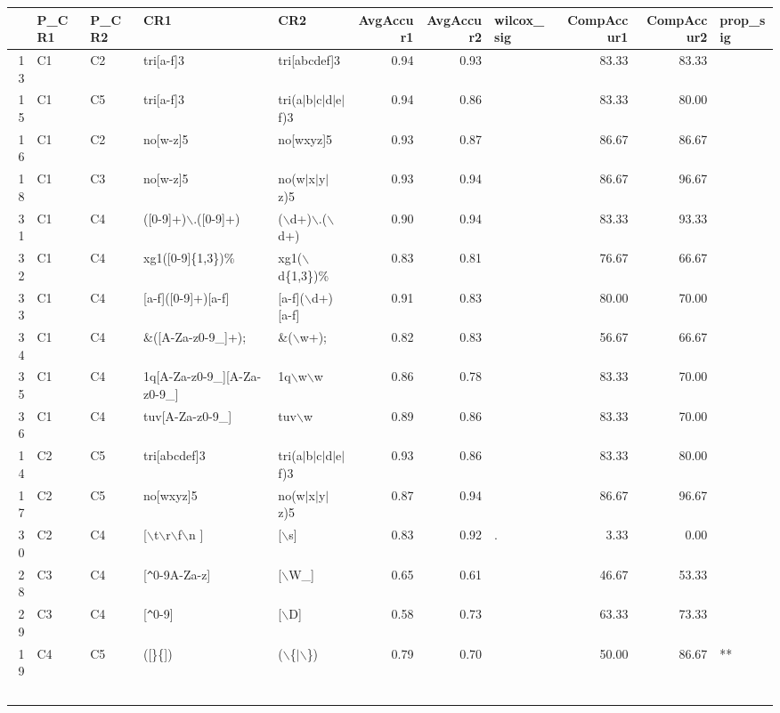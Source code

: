 \begin{table*}[ht]
\centering
\begin{tabular}{rllllrrlrrl}
  \hline
 & P\_CR1 & P\_CR2 & CR1 & CR2 & AvgAccur1 & AvgAccur2 & wilcox\_sig & CompAccur1 & CompAccur2 & prop\_sig \\ 
  \hline
13 & C1 & C2 & tri[a-f]3 & tri[abcdef]3 & 0.94 & 0.93 &   & 83.33 & 83.33 &   \\ 
  15 & C1 & C5 & tri[a-f]3 & tri(a$|$b$|$c$|$d$|$e$|$f)3 & 0.94 & 0.86 &   & 83.33 & 80.00 &   \\ 
  16 & C1 & C2 & no[w-z]5 & no[wxyz]5 & 0.93 & 0.87 &   & 86.67 & 86.67 &   \\ 
  18 & C1 & C3 & no[w-z]5 & no(w$|$x$|$y$|$z)5 & 0.93 & 0.94 &   & 86.67 & 96.67 &   \\ 
  31 & C1 & C4 & ([0-9]+)$\backslash$.([0-9]+) & ($\backslash$d+)$\backslash$.($\backslash$d+) & 0.90 & 0.94 &   & 83.33 & 93.33 &   \\ 
  32 & C1 & C4 & xg1([0-9]\{1,3\})\% & xg1($\backslash$d\{1,3\})\% & 0.83 & 0.81 &   & 76.67 & 66.67 &   \\ 
  33 & C1 & C4 & [a-f]([0-9]+)[a-f] & [a-f]($\backslash$d+)[a-f] & 0.91 & 0.83 &   & 80.00 & 70.00 &   \\ 
  34 & C1 & C4 & \&([A-Za-z0-9\_]+); & \&($\backslash$w+); & 0.82 & 0.83 &   & 56.67 & 66.67 &   \\ 
  35 & C1 & C4 & 1q[A-Za-z0-9\_][A-Za-z0-9\_] & 1q$\backslash$w$\backslash$w & 0.86 & 0.78 &   & 83.33 & 70.00 &   \\ 
  36 & C1 & C4 & tuv[A-Za-z0-9\_] & tuv$\backslash$w & 0.89 & 0.86 &   & 83.33 & 70.00 &   \\ 
  14 & C2 & C5 & tri[abcdef]3 & tri(a$|$b$|$c$|$d$|$e$|$f)3 & 0.93 & 0.86 &   & 83.33 & 80.00 &   \\ 
  17 & C2 & C5 & no[wxyz]5 & no(w$|$x$|$y$|$z)5 & 0.87 & 0.94 &   & 86.67 & 96.67 &   \\ 
  30 & C2 & C4 & [$\backslash$t$\backslash$r$\backslash$f$\backslash$n ] & [$\backslash$s] & 0.83 & 0.92 & . & 3.33 & 0.00 &   \\ 
  28 & C3 & C4 & [\verb|^|0-9A-Za-z] & [$\backslash$W\_] & 0.65 & 0.61 &   & 46.67 & 53.33 &   \\ 
  29 & C3 & C4 & [\verb|^|0-9] & [$\backslash$D] & 0.58 & 0.73 &   & 63.33 & 73.33 &   \\ 
  19 & C4 & C5 & ([\}\{]) & ($\backslash$\{$|$$\backslash$\}) & 0.79 & 0.70 &   & 50.00 & 86.67 & ** \\ 
$$
\end{tabular}
\end{table*}
